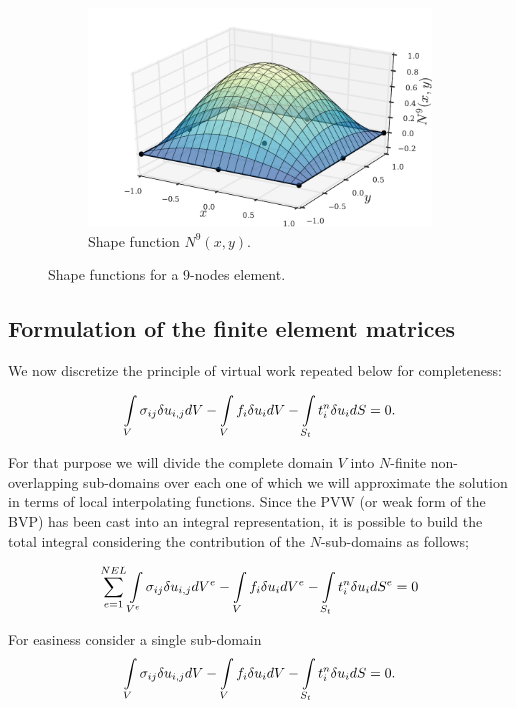 \begin{figure}
\begin{subfigure}[b]{0.45\textwidth}
		\includegraphics[width=\textwidth]{shape_func-9-nodes-9.pdf}
		\caption{Shape function $N^9(x,y)$.}
	\end{subfigure}
\caption{Shape functions for a 9-nodes element.}
\label{fig:nine-nodes-interp}
\end{figure}

\subsection{Formulation of the finite element matrices}
We now discretize the principle of virtual work repeated below for completeness:

\begin{equation} \label{pvw_2}
\int\limits_V \sigma_{ij} \delta u_{i,j} dV - \int\limits_V f_i \delta u_i dV - \int\limits_{S_t} t_i^n \delta u_i dS = 0.
\end{equation}

For that purpose we will divide the complete domain $V$ into $N$-finite non-overlapping sub-domains over each one of which we will approximate the solution in terms of local interpolating functions. Since the PVW (or weak form of the BVP) has been cast into an integral representation, it is possible to build the total integral considering the contribution of the $N$-sub-domains as follows;

\begin{equation}\label{pvw_dis}
\sum_{e=1}^{NEL} \int\limits_{V^e} \sigma_{ij} \delta u_{i,j} d{V^e} - \int\limits_V f_i \delta u_i d{V^e} - \int\limits_{S_t} t_i^n \delta u_id{S^e} = 0 
\end{equation}

For easiness consider a single sub-domain
\begin{equation} \label{pvw_sing}
\int\limits_V \sigma_{ij} \delta u_{i,j} dV - \int\limits_V f_i\delta u_idV - \int\limits_{S_t} t_i^n \delta u_i dS = 0.
\end{equation}

